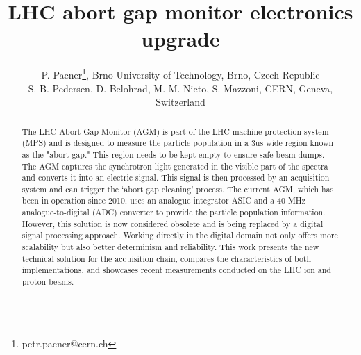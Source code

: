



\title{LHC abort gap monitor electronics upgrade}

\author{P. Pacner\thanks{petr.pacner@cern.ch}, Brno University of Technology, Brno, Czech Republic \\
		S. B. Pedersen, D. Belohrad, M. M. Nieto, S. Mazzoni, CERN, Geneva, Switzerland}
	
\maketitle

\begin{abstract}
    The LHC Abort Gap Monitor (AGM) is part of the LHC machine protection
    system (MPS) and is designed to measure the particle population in a 3us
    wide region known as the "abort gap." This region needs to be kept empty to
    ensure safe beam dumps. The AGM captures the synchrotron light generated in
    the visible part of the spectra and converts it into an electric signal.
    This signal is then processed by an acquisition system and can trigger the
    ‘abort gap cleaning’ process. The current AGM, which has been in operation
    since 2010, uses an analogue integrator ASIC and a 40 MHz
    analogue-to-digital (ADC) converter to provide the particle population
    information. However, this solution is now considered obsolete and is being
    replaced by a digital signal processing approach. Working directly in the
    digital domain not only offers more scalability but also better determinism
    and reliability. This work presents the new technical solution for the
    acquisition chain, compares the characteristics of both implementations,
    and showcases recent measurements conducted on the LHC ion and proton
    beams.
\end{abstract}

